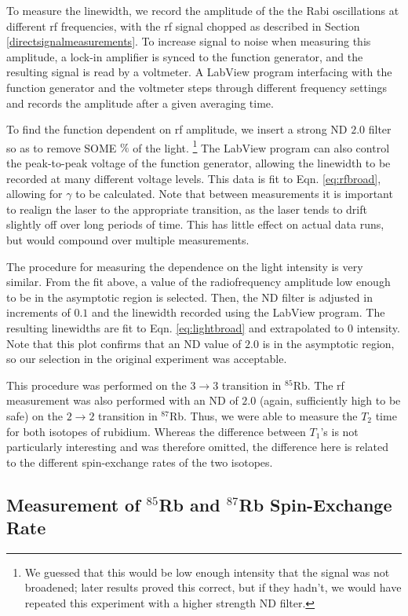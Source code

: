 To measure the linewidth, we record the amplitude of the the Rabi oscillations at different rf frequencies, with the rf signal chopped as described in Section \ref{directsignalmeasurements}. To increase signal to noise when measuring this amplitude, a lock-in amplifier is synced to the function generator, and the resulting signal is read by a voltmeter. A LabView program interfacing with the function generator and the voltmeter steps through different frequency settings and records the amplitude after a given averaging time.

To find the function dependent on rf amplitude, we insert a strong ND $2.0$ filter so as to remove SOME $\%$ of the light. \footnote{We guessed that this would be low enough intensity that the signal was not broadened; later results proved this correct, but if they hadn't, we would have repeated this experiment with a higher strength ND filter.} The LabView program can also control the peak-to-peak voltage of the function generator, allowing the linewidth to be recorded at many different voltage levels. This data is fit to Eqn. \ref{eq:rfbroad}, allowing for $\gamma$ to be calculated. Note that between measurements it is important to realign the laser to the appropriate transition, as the laser tends to drift slightly off over long periods of time. This has little effect on actual data runs, but would compound over multiple measurements.

The procedure for measuring the dependence on the light intensity is very similar. From the fit above, a value of the radiofrequency amplitude low enough to be in the asymptotic region is selected. Then, the ND filter is adjusted in increments of $0.1$ and the linewidth recorded using the LabView program. The resulting linewidths are fit to Eqn. \ref{eq:lightbroad} and extrapolated to 0 intensity.  Note that this plot confirms that an ND value of $2.0$ is in the asymptotic region, so our selection in the original experiment was acceptable.

This procedure was performed on the $3\rightarrow3$ transition in $^{85}$Rb. The rf measurement was also performed with an ND of $2.0$ (again, sufficiently high to be safe) on the $2\rightarrow2$ transition in $^{87}$Rb. Thus, we were able to measure the $T_{2}$ time for both isotopes of rubidium. Whereas the difference between $T_{1}$'s is not particularly interesting and was therefore omitted, the difference here is related to the different spin-exchange rates of the two isotopes.

\subsection{Measurement of $^{85}$Rb and $^{87}$Rb Spin-Exchange Rate}

